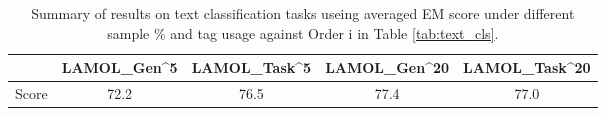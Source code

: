 \begin{table}[t]
\centering
    \begin{tabular}{l*{4}{c}}
    \toprule
     & \footnotesize LAMOL_{Gen}^5 & \footnotesize LAMOL_{Task}^5 & \footnotesize LAMOL_{Gen}^{20} & \footnotesize LAMOL_{Task}^{20} \\
    \midrule
    Score & 72.2 & 76.5 & 77.4 & 77.0 \\
    \bottomrule
    \end{tabular}
    \caption{Summary of results on text classification tasks useing averaged EM score under different sample \% and tag usage against Order i in Table \ref{tab:text_cls}.}
\label{tab:text_cls_order1}
\end{table}